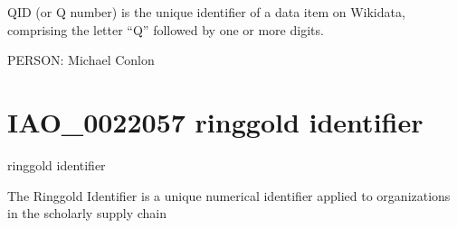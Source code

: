 \documentclass[letterpaper,10pt,english]{sphinxmanual}
\begin{document}
\begin{sphinxShadowBox}

\sphinxAtStartPar
QID (or Q number) is the unique identifier of a data item on Wikidata, comprising the letter “Q” followed by one or more digits.
\end{sphinxShadowBox}

\begin{sphinxShadowBox}

\sphinxAtStartPar
{}
\end{sphinxShadowBox}

\begin{sphinxShadowBox}

\sphinxAtStartPar
{}
\end{sphinxShadowBox}

\begin{sphinxShadowBox}

\sphinxAtStartPar
PERSON: Michael Conlon
\end{sphinxShadowBox}
\begin{quote}
\label{\detokenize{doc-IAO_0022057:iao-0022057}}\label{\detokenize{doc-IAO_0022057:ringgold-identifier}}\label{\detokenize{doc-IAO_0022057:iao-0022057}}
\ignorespaces \end{quote}


\section{IAO\_0022057 \sphinxhyphen{} ringgold identifier}
\label{\detokenize{doc-IAO_0022057:iao-0022057-ringgold-identifier}}\label{\detokenize{doc-IAO_0022057:index-0}}\label{\detokenize{doc-IAO_0022057::doc}}
\begin{sphinxShadowBox}

\sphinxAtStartPar
ringgold identifier
\end{sphinxShadowBox}

\begin{sphinxShadowBox}

\sphinxAtStartPar
The Ringgold Identifier is a unique numerical identifier applied to organizations in the scholarly supply chain
\end{sphinxShadowBox}
\end{document}
